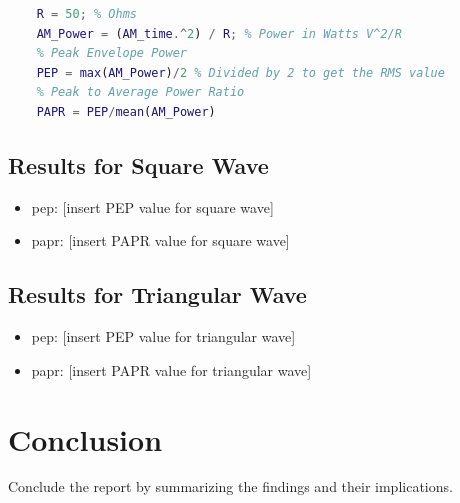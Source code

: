 \documentclass[a4paper]{article}
\begin{document}
\begin{lstlisting}[language=Matlab]
    % AM Power
    R = 50; % Ohms
    AM_Power = (AM_time.^2) / R; % Power in Watts V^2/R
    % Peak Envelope Power
    PEP = max(AM_Power)/2 % Divided by 2 to get the RMS value
    % Peak to Average Power Ratio
    PAPR = PEP/mean(AM_Power)
\end{lstlisting}

\subsection{Results for Square Wave}

\begin{itemize}
    \item \gls{pep}: [insert PEP value for square wave]
    \item \gls{papr}: [insert PAPR value for square wave]
\end{itemize}

\subsection{Results for Triangular Wave}

\begin{itemize}
    \item \gls{pep}: [insert PEP value for triangular wave]
    \item \gls{papr}: [insert PAPR value for triangular wave]
\end{itemize}

\section{Conclusion}
Conclude the report by summarizing the findings and their implications.
\end{document}

